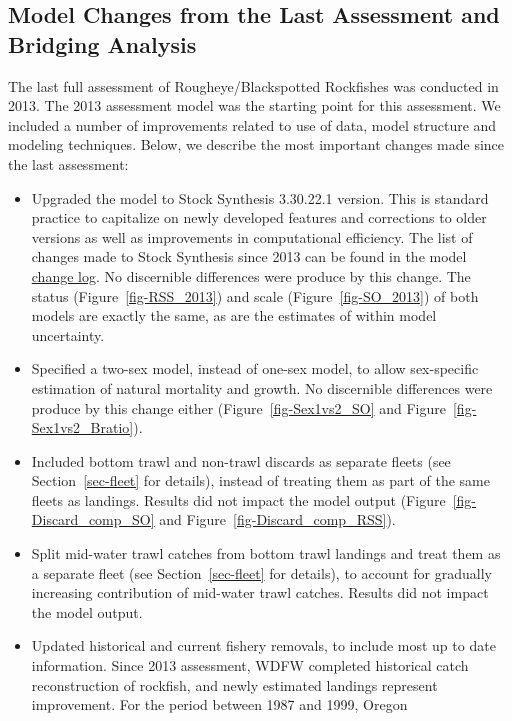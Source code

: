 \documentclass[
]{scrartcl}
\providecommand{\tightlist}{%
  \setlength{\itemsep}{0pt}\setlength{\parskip}{0pt}}\usepackage{longtable,booktabs,array}
\begin{document}
\subsection{Model Changes from the Last Assessment and Bridging
Analysis}\label{sec-bridging}

The last full assessment of Rougheye/Blackspotted Rockfishes was
conducted in 2013. The 2013 assessment model was the starting point for
this assessment. We included a number of improvements related to use of
data, model structure and modeling techniques. Below, we describe the
most important changes made since the last assessment:

\begin{itemize}
\tightlist
\item
  Upgraded the model to Stock Synthesis 3.30.22.1 version. This is
  standard practice to capitalize on newly developed features and
  corrections to older versions as well as improvements in computational
  efficiency. The list of changes made to Stock Synthesis since 2013 can
  be found in the model
  \href{https://github.com/orgs/nmfs-ost/projects/11}{change log}. No
  discernible differences were produce by this change. The status
  (Figure~\ref{fig-RSS_2013}) and scale (Figure~\ref{fig-SO_2013}) of
  both models are exactly the same, as are the estimates of within model
  uncertainty.
\item
  Specified a two-sex model, instead of one-sex model, to allow
  sex-specific estimation of natural mortality and growth. No
  discernible differences were produce by this change either
  (Figure~\ref{fig-Sex1vs2_SO} and Figure~\ref{fig-Sex1vs2_Bratio}).
\item
  Included bottom trawl and non-trawl discards as separate fleets (see
  Section~\ref{sec-fleet} for details), instead of treating them as part
  of the same fleets as landings. Results did not impact the model
  output (Figure~\ref{fig-Discard_comp_SO} and
  Figure~\ref{fig-Discard_comp_RSS}).
\item
  Split mid-water trawl catches from bottom trawl landings and treat
  them as a separate fleet (see Section~\ref{sec-fleet} for details), to
  account for gradually increasing contribution of mid-water trawl
  catches. Results did not impact the model output.
\item
  Updated historical and current fishery removals, to include most up to
  date information. Since 2013 assessment, WDFW completed historical
  catch reconstruction of rockfish, and newly estimated landings
  represent improvement. For the period between 1987 and 1999, Oregon

\end{itemize}
\end{document}
